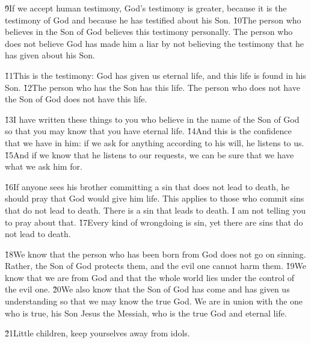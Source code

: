 \v{9}If we accept human testimony, God's testimony is greater, because it is the testimony of God and because he has testified about his Son. \v{10}The person who believes in the Son of God believes this testimony personally. The person who does not believe God has made him a liar by not believing the testimony that he has given about his Son.

\v{11}This is the testimony: God has given us eternal life, and this life is found in his Son. \v{12}The person who has the Son has this life. The person who does not have the Son of God does not have this life.

\v{13}I have written these things to you who believe in the name of the Son of God so that you may know that you have eternal life. \v{14}And this is the confidence that we have in him: if we ask for anything according to his will, he listens to us. \v{15}And if we know that he listens to our requests, we can be sure that we have what we ask him for.

\v{16}If anyone sees his brother committing a sin that does not lead to death, he should pray that God would give him life. This applies to those who commit sins that do not lead to death. There is a sin that leads to death. I am not telling you to pray about that. \v{17}Every kind of wrongdoing is sin, yet there are sins that do not lead to death.

\v{18}We know that the person who has been born from God does not go on sinning. Rather, the Son of God protects them, and the evil one cannot harm them. \v{19}We know that we are from God and that the whole world lies under the control of the evil one. \v{20}We also know that the Son of God has come and has given us understanding so that we may know the true God. We are in union with the one who is true, his Son Jesus the Messiah, who is the true God and eternal life.

\v{21}Little children, keep yourselves away from idols.
